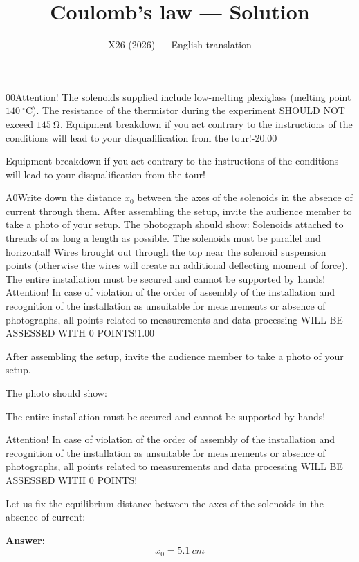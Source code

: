 \documentclass[11pt,a4paper]{article}
\title{\textbf{Coulomb's law --- Solution}}
\author{\normalsize X26 (2026) — English translation}
\date{}
\begin{document}
\maketitle\vspace{-0.5em}
\begin{solcard}{00}{Attention! The solenoids supplied include low-melting plexiglass (melting point $140~{}^\circ\mathrm C$). The resistance of the thermistor during the experiment SHOULD NOT exceed $145~\mathrm{\Omega}$. Equipment breakdown if you act contrary to the instructions of the conditions will lead to your disqualification from the tour!}{-20.00}

Equipment breakdown if you act contrary to the instructions of the conditions will lead to your disqualification from the tour!

\end{solcard}

\begin{solcard}{A0}{Write down the distance $x_{0}$ between the axes of the solenoids in the absence of current through them. After assembling the setup, invite the audience member to take a photo of your setup. The photograph should show: Solenoids attached to threads of as long a length as possible. The solenoids must be parallel and horizontal! Wires brought out through the top near the solenoid suspension points (otherwise the wires will create an additional deflecting moment of force). The entire installation must be secured and cannot be supported by hands! Attention! In case of violation of the order of assembly of the installation and recognition of the installation as unsuitable for measurements or absence of photographs, all points related to measurements and data processing WILL BE ASSESSED WITH 0 POINTS!}{1.00}

After assembling the setup, invite the audience member to take a photo of your setup.


The photo should show:


The entire installation must be secured and cannot be supported by hands!


Attention! In case of violation of the order of assembly of the installation and recognition of the installation as unsuitable for measurements or absence of photographs, all points related to measurements and data processing WILL BE ASSESSED WITH 0 POINTS!


Let us fix the equilibrium distance between the axes of the solenoids in the absence of current:

\par\smallskip\noindent\textbf{Answer:} $$x_{0}=5.1~cm$$
\end{solcard}
\end{document}
